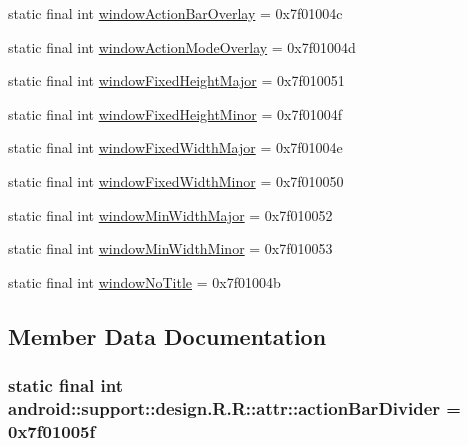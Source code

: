 \begin{CompactItemize}
\item 
static final int \hyperlink{classandroid_1_1support_1_1design_1_1_r_1_1attr_add17c6b2b4351967e0a97e924d870d3}{windowActionBarOverlay} = 0x7f01004c
\item 
static final int \hyperlink{classandroid_1_1support_1_1design_1_1_r_1_1attr_9b33a9d31a46283c061f1bb1559fb361}{windowActionModeOverlay} = 0x7f01004d
\item 
static final int \hyperlink{classandroid_1_1support_1_1design_1_1_r_1_1attr_7d460d436cee93a5412a70711079a44a}{windowFixedHeightMajor} = 0x7f010051
\item 
static final int \hyperlink{classandroid_1_1support_1_1design_1_1_r_1_1attr_6e4f087482ee854686d31c0094e1cab9}{windowFixedHeightMinor} = 0x7f01004f
\item 
static final int \hyperlink{classandroid_1_1support_1_1design_1_1_r_1_1attr_831fbd5bf9f607f8185f79b4b512fa0a}{windowFixedWidthMajor} = 0x7f01004e
\item 
static final int \hyperlink{classandroid_1_1support_1_1design_1_1_r_1_1attr_7ad985a7157b1c7adf744c9104980da1}{windowFixedWidthMinor} = 0x7f010050
\item 
static final int \hyperlink{classandroid_1_1support_1_1design_1_1_r_1_1attr_be157dea2a1ee83c5c37ea2debc9980b}{windowMinWidthMajor} = 0x7f010052
\item 
static final int \hyperlink{classandroid_1_1support_1_1design_1_1_r_1_1attr_36776b33e0d3df31275a44cbc9202694}{windowMinWidthMinor} = 0x7f010053
\item 
static final int \hyperlink{classandroid_1_1support_1_1design_1_1_r_1_1attr_412a8ae293fd771d1761f1e9a461d881}{windowNoTitle} = 0x7f01004b
\end{CompactItemize}


\subsection{Member Data Documentation}
\hypertarget{classandroid_1_1support_1_1design_1_1_r_1_1attr_a9388f5230e37829f52c8e610a89612f}{
\subsubsection[{actionBarDivider}]{\setlength{\rightskip}{0pt plus 5cm}static final int android::support::design.R.R::attr::actionBarDivider = 0x7f01005f}}
\label{classandroid_1_1support_1_1design_1_1_r_1_1attr_a9388f5230e37829f52c8e610a89612f}


